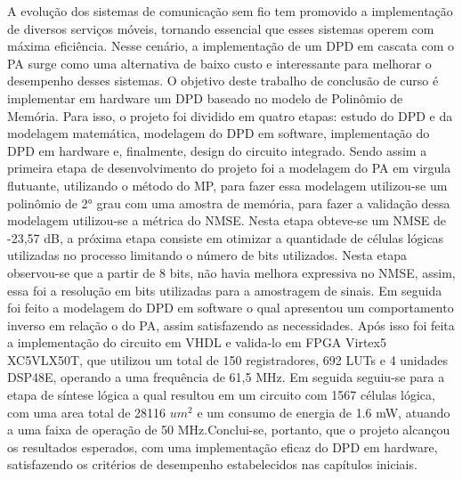 A evolução dos sistemas de comunicação sem fio tem promovido a implementação de diversos serviços móveis, tornando essencial que esses sistemas operem com máxima eficiência. Nesse cenário, a implementação de um DPD em cascata com o PA surge como uma alternativa de baixo custo e interessante para melhorar o desempenho desses sistemas.
O objetivo deste trabalho de conclusão de curso é implementar em hardware um DPD baseado no modelo de Polinômio de Memória. Para isso, o projeto foi dividido em quatro etapas: estudo do DPD e da modelagem matemática, modelagem do DPD em software, implementação do DPD em hardware e, finalmente, design do circuito integrado.
Sendo assim a primeira etapa de desenvolvimento do projeto foi a modelagem do PA em virgula flutuante, utilizando o método do MP, para fazer essa modelagem utilizou-se um polinômio de 2° grau com uma amostra de memória, para fazer a validação dessa modelagem utilizou-se a métrica do NMSE. Nesta etapa obteve-se um NMSE de -23,57 dB, a próxima etapa consiste em otimizar a quantidade de células lógicas utilizadas no processo limitando o número de bits utilizados. Nesta etapa observou-se que a partir de 8 bits, não havia melhora expressiva no NMSE, assim, essa foi a resolução em bits utilizadas para a amostragem de sinais. Em seguida foi feito a modelagem do DPD em software o qual apresentou um comportamento inverso em relação o do PA, assim satisfazendo as necessidades.  Após isso foi feita a implementação do circuito em VHDL e valida-lo em FPGA Virtex5 XC5VLX50T, que utilizou um total de 150 registradores, 692 LUTs e 4 unidades DSP48E, operando a uma frequência de 61,5 MHz. Em seguida seguiu-se para a etapa de síntese lógica a qual resultou em um circuito com 1567 células lógica, com uma area total de 28116 $um^2$ e um consumo de energia de 1.6 mW, atuando a uma faixa de operação de 50 MHz.Conclui-se, portanto, que o projeto alcançou os resultados esperados, com uma implementação eficaz do DPD em hardware, satisfazendo os critérios de desempenho estabelecidos nas capítulos iniciais.
